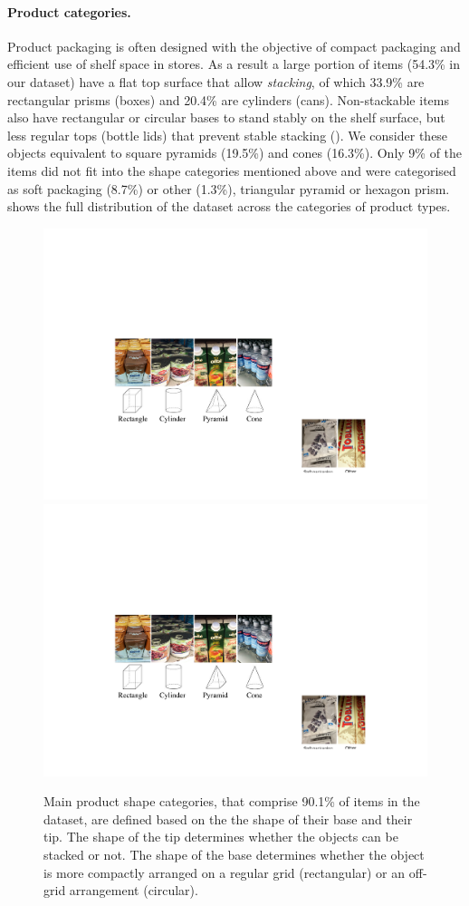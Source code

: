\paragraph*{Product categories.} 
Product packaging is often designed with the objective of compact packaging and efficient use of shelf space in stores.
As a result a large portion of items (54.3\% in our dataset) have a flat top surface that allow {\em stacking}, of which 33.9\% are rectangular prisms (\ie boxes) and 20.4\% are cylinders (\ie cans). 
Non-stackable items also have rectangular or circular bases to stand stably on the shelf surface, but less regular tops (\eg bottle lids) that prevent stable stacking ().
We consider these objects equivalent to square pyramids (19.5\%) and cones (16.3\%).
Only 9\% of the items did not fit into the shape categories mentioned above and were categorised as soft packaging (8.7\%) or other (1.3\%), \eg triangular pyramid or hexagon prism.
 shows the full distribution of the dataset across the categories of product types.

\begin{figure}[h]
	\centering      
	\includegraphics[width=0.6\linewidth]{figures/typespictures}
	\includegraphics[width=0.6\linewidth]{figures/types}
	\caption{Main product shape categories, that comprise 90.1\% of items in the dataset, are defined based on the the shape of their base and their tip. The shape of the tip determines whether the objects can be stacked or not. The shape of the base determines whether the object is more compactly arranged on a regular grid (rectangular) or an off-grid arrangement (circular).}
	\label{fig:types}
\end{figure}


